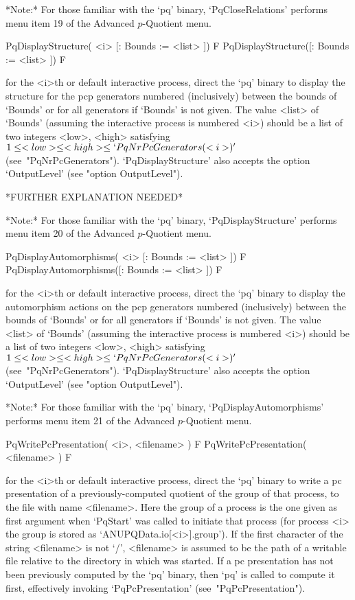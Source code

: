 *Note:* 
For those familiar with  the  `pq'  binary,  `PqCloseRelations'  performs
menu item 19 of the Advanced $p$-Quotient menu.

\>PqDisplayStructure( <i> [: Bounds := <list> ]) F
\>PqDisplayStructure([: Bounds := <list> ]) F

for the <i>th or default interactive {\ANUPQ} process,  direct  the  `pq'
binary  to  display  the  structure  for  the  pcp  generators   numbered
(inclusively) between the bounds of `Bounds' or  for  all  generators  if
`Bounds' is not  given.  The  value  <list>  of  `Bounds'  (assuming  the
interactive process is numbered <i>) should be a  list  of  two  integers
<low>,   <high>   satisfying   $1    \le    <low>    \le    <high>    \le
`PqNrPcGenerators(<i>)'$  (see~"PqNrPcGenerators").  `PqDisplayStructure'
also accepts the option `OutputLevel' (see "option OutputLevel").

*FURTHER EXPLANATION NEEDED*

*Note:*
For those familiar with the `pq'  binary,  `PqDisplayStructure'  performs
menu item 20 of the Advanced $p$-Quotient menu.

\>PqDisplayAutomorphisms( <i> [: Bounds := <list> ]) F
\>PqDisplayAutomorphisms([: Bounds := <list> ]) F

for the <i>th or default interactive {\ANUPQ} process,  direct  the  `pq'
binary to display the automorphism actions on the pcp generators numbered
(inclusively) between the bounds of `Bounds' or  for  all  generators  if
`Bounds' is not  given.  The  value  <list>  of  `Bounds'  (assuming  the
interactive process is numbered <i>) should be a  list  of  two  integers
<low>,   <high>   satisfying   $1    \le    <low>    \le    <high>    \le
`PqNrPcGenerators(<i>)'$  (see~"PqNrPcGenerators").  `PqDisplayStructure'
also accepts the option `OutputLevel' (see "option OutputLevel").

*Note:*
For  those  familiar  with  the  `pq'  binary,   `PqDisplayAutomorphisms'
performs menu item 21 of the Advanced $p$-Quotient menu.

\>PqWritePcPresentation( <i>, <filename> ) F
\>PqWritePcPresentation( <filename> ) F

for the <i>th or default interactive {\ANUPQ} process,  direct  the  `pq'
binary to write a pc presentation of a  previously-computed  quotient  of
the group of that process, to the file with  name  <filename>.  Here  the
group of a process is the one given as first argument when `PqStart'  was
called to initiate that process (for process <i> the group is  stored  as
`ANUPQData.io[<i>].group').  If  the  first  character  of   the   string
<filename> is not `/', <filename> is assumed to be the path of a writable
file relative to the directory in which  {\GAP}  was  started.  If  a  pc
presentation has not been previously computed by the  `pq'  binary,  then
`pq'   is   called   to   compute   it   first,   effectively    invoking
`PqPcPresentation' (see~"PqPcPresentation").

